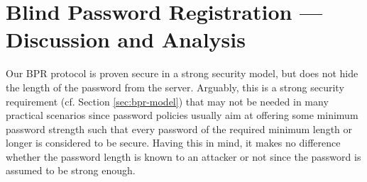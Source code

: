 \section{Blind Password Registration --- Discussion and Analysis} \label{sec:discussion}
Our BPR protocol is proven secure in a strong security model, but does not hide the length of the password from the server. Arguably, this is a strong security requirement (cf. Section \ref{sec:bpr-model}) that may not be needed in many practical scenarios since password policies usually aim at offering some minimum password strength such that every password of the required minimum length or longer is considered to be secure.
Having this in mind, it makes no difference whether the password length is known to an attacker or not since the password is assumed to be strong enough.


